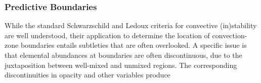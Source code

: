 {\color{brown}
\subsubsection{Predictive Boundaries}

While the standard Schwarzschild and Ledoux criteria for convective (in)stability are well understood, their application to determine the location of convection-zone boundaries entails subtleties that are often overlooked. A specific issue is that elemental abundances at boundaries are often discontinuous, due to the juxtaposition between well-mixed and unmixed regions. The corresponding discontinuities in opacity and other variables produce 

}